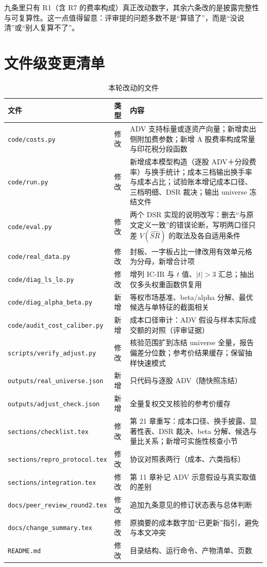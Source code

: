 \documentclass[11pt,a4paper]{ctexart}
\begin{document}
九条里只有 R1（含 R7 的费率构成）真正改动数字，其余六条改的是披露完整性与可复算性。这一点值得留意：评审提的问题多数不是“算错了”，而是“没说清”或“别人复算不了”。

\section{文件级变更清单}

\begin{table}[htbp]
\centering
\caption{本轮改动的文件}
\label{tab:files}
\begin{tabular}{@{}>{\raggedright\arraybackslash}p{4.6cm}>{\raggedright\arraybackslash}p{1.4cm}>{\raggedright\arraybackslash}p{8.4cm}@{}}
\toprule
文件 & 类型 & 内容 \\
\midrule
\texttt{code/costs.py} & 修改 & ADV 支持标量或逐资产向量；新增卖出侧附加费参数；新增 A 股费率构成常量与印花税分段函数 \\
\texttt{code/run.py} & 修改 & 新增成本模型构造（逐股 ADV＋分段费率）与换手统计；成本三档输出换手率与成本占比；试验账本增记成本口径、三档明细、$\text{DSR}$ 裁决；输出 universe 冻结文件 \\
\texttt{code/eval.py} & 修改 & 两个 DSR 实现的说明改写：删去“与原文定义一致”的错误论断，写明两口径只差 $V(\widehat{SR})$ 的取法及各自适用条件 \\
\texttt{code/real\_data.py} & 修改 & 封板、一字板占比一律改用有效单元格为分母，新增合计项 \\
\texttt{code/diag\_ls\_lo.py} & 修改 & 增列 IC-IR 与 $t$ 值、$|t|>3$ 汇总；抽出仅多头权重函数供复用 \\
\texttt{code/diag\_alpha\_beta.py} & 新增 & 等权市场基准、beta/alpha 分解、最优候选与单特征的截面相关 \\
\texttt{code/audit\_cost\_caliber.py} & 新增 & 成本口径审计：ADV 假设与样本实际成交额的对照（评审证据） \\
\texttt{scripts/verify\_adjust.py} & 修改 & 核验范围扩到冻结 universe 全量，报告偏差分位数；参考价结果缓存；保留抽样快速模式 \\
\texttt{outputs/real\_universe.json} & 新增 & 400 只代码与逐股 ADV（随快照冻结） \\
\texttt{outputs/adjust\_check.json} & 新增 & 全量复权交叉核验的参考价缓存 \\
\texttt{sections/checklist.tex} & 修改 & 第 21 章重写：成本口径、换手披露、显著性表、DSR 裁决、beta 分解、候选与量比关系；新增可实施性核查小节 \\
\texttt{sections/repro\_protocol.tex} & 修改 & 协议对照表两行（成本、六类指标） \\
\texttt{sections/integration.tex} & 修改 & 第 11 章补记 ADV 示意假设与真实取值的差别 \\
\texttt{docs/peer\_review\_round2.tex} & 修改 & 追加九条意见的修订状态表与总体判断 \\
\texttt{docs/change\_summary.tex} & 修改 & 原摘要的成本数字加“已更新”指引，避免与本文冲突 \\
\texttt{README.md} & 修改 & 目录结构、运行命令、产物清单、页数 \\
\bottomrule
\end{tabular}
\end{table}
\end{document}
